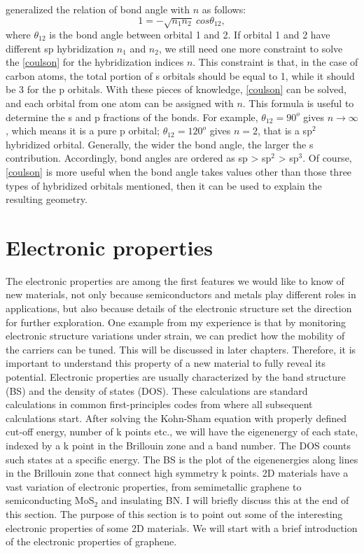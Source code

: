 \citet{coulson1949} generalized the relation of bond angle with $n$ as follows:
\begin{equation}\label{coulson}
1=-\sqrt{n_1n_2}~cos\theta_{12}, 
\end{equation}
where $\theta_{12}$ is the bond angle between orbital 1 and 2. If orbital 1 and 2 have different sp hybridization $n_1$ and $n_2$, we still need one more constraint to solve the \autoref{coulson} for the hybridization indices $n$. This constraint is that, in the case of carbon atoms, the total portion of s orbitals should be equal to 1, while it should be 3 for the p orbitals. With these pieces of knowledge, \autoref{coulson} can be solved, and each orbital from one atom can be assigned with $n$. This formula is useful to determine the s and p fractions of the bonds. For example, $\theta_{12}=90^o$ gives $n\rightarrow\infty$, which means it is a pure p orbital; $\theta_{12}=120^o$ gives $n=2$, that is a sp$^2$ hybridized orbital. Generally, the wider the bond angle, the larger the s contribution. Accordingly, bond angles are ordered as sp > sp$^2$ > sp$^3$. Of course, \autoref{coulson} is more useful when the bond angle takes values other than those three types of hybridized orbitals mentioned, then it can be used to explain the resulting geometry.

\section{Electronic properties}

The electronic properties are among the first features we would like to know of new materials, not only because semiconductors and metals play different roles in applications, but also because details of the electronic structure set the direction for further exploration. One example from my experience is that by monitoring electronic structure variations under strain, we can predict how the mobility of the carriers can be tuned. This will be discussed in later chapters. Therefore, it is important to understand this property of a new material to fully reveal its potential. Electronic properties are usually characterized by the band structure (BS) and the density of states (DOS). These calculations are standard calculations in common first-principles codes from where all subsequent calculations start. After solving the Kohn-Sham equation with properly defined cut-off energy, number of k points etc., we will have the eigenenergy of each state, indexed by a k point in the Brillouin zone and a band number.  The DOS counts such states at a specific energy. The BS is the plot of the eigenenergies along lines in the Brillouin zone that connect high symmetry k points.  2D materials have a vast variation of electronic properties, from semimetallic graphene to semiconducting MoS$_2$ and insulating BN. I will briefly discuss this at the end of this section. The purpose of this section is to point out some of the interesting electronic properties of some 2D materials. We will start with a brief introduction of the electronic properties of graphene.

